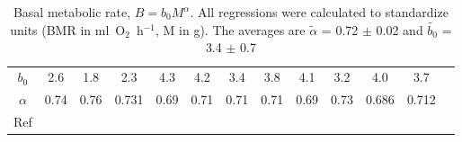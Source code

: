 \begin{table}%
\centering
\begin{tabular}{|c|c|c|c|c|c|c|c|c|c|c|c|c|}
\hline
$b_0$ & 2.6  & 1.8  & 2.3  & 4.3 &4.2 & 3.4 & 3.8 &4.1 &3.2 &4.0& 3.7 \\
$\alpha$  & 0.74  & 0.76  & 0.731  & 0.69  & 0.71  & 0.71  & 0.71 & 0.69  & 0.73  & 0.686  & 0.712  \\
Ref  &\cite{Kleiber32}  &\cite{Gano38} &\cite{Brody45}    &\cite{Hayssen85} &\cite{Elgar87} &\cite{McNab88} &\cite{Heusner91} &\cite{Lovegrove00} &\cite{Symonds02} &\cite{White03} &\cite{Savage04} \\
\hline
\end{tabular}
\caption{Basal metabolic rate, $B = b_0 M^\alpha$. All regressions were calculated to standardize units (BMR in ml~O$_2$~h$^{-1}$, M in g). The averages are $\tilde{\alpha}$ = 0.72 $\pm$ 0.02 and $\tilde{b_0}$ = 3.4 $\pm$ 0.7}
\label{tab:alpha}
\end{table}

